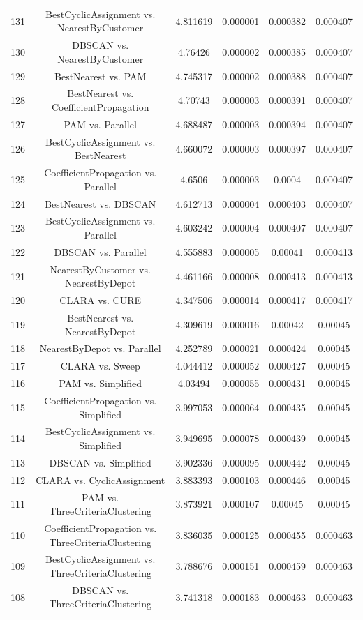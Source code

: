 \documentclass[a4paper,10pt]{article}
\begin{document}
\begin{landscape}
\begin{table}[!htp]
\begin{tabular}{cccccc}
131&BestCyclicAssignment vs. NearestByCustomer&4.811619&0.000001&0.000382&0.000407\\
130&DBSCAN vs. NearestByCustomer&4.76426&0.000002&0.000385&0.000407\\
129&BestNearest vs. PAM&4.745317&0.000002&0.000388&0.000407\\
128&BestNearest vs. CoefficientPropagation&4.70743&0.000003&0.000391&0.000407\\
127&PAM vs. Parallel&4.688487&0.000003&0.000394&0.000407\\
126&BestCyclicAssignment vs. BestNearest&4.660072&0.000003&0.000397&0.000407\\
125&CoefficientPropagation vs. Parallel&4.6506&0.000003&0.0004&0.000407\\
124&BestNearest vs. DBSCAN&4.612713&0.000004&0.000403&0.000407\\
123&BestCyclicAssignment vs. Parallel&4.603242&0.000004&0.000407&0.000407\\
122&DBSCAN vs. Parallel&4.555883&0.000005&0.00041&0.000413\\
121&NearestByCustomer vs. NearestByDepot&4.461166&0.000008&0.000413&0.000413\\
120&CLARA vs. CURE&4.347506&0.000014&0.000417&0.000417\\
119&BestNearest vs. NearestByDepot&4.309619&0.000016&0.00042&0.00045\\
118&NearestByDepot vs. Parallel&4.252789&0.000021&0.000424&0.00045\\
117&CLARA vs. Sweep&4.044412&0.000052&0.000427&0.00045\\
116&PAM vs. Simplified&4.03494&0.000055&0.000431&0.00045\\
115&CoefficientPropagation vs. Simplified&3.997053&0.000064&0.000435&0.00045\\
114&BestCyclicAssignment vs. Simplified&3.949695&0.000078&0.000439&0.00045\\
113&DBSCAN vs. Simplified&3.902336&0.000095&0.000442&0.00045\\
112&CLARA vs. CyclicAssignment&3.883393&0.000103&0.000446&0.00045\\
111&PAM vs. ThreeCriteriaClustering&3.873921&0.000107&0.00045&0.00045\\
110&CoefficientPropagation vs. ThreeCriteriaClustering&3.836035&0.000125&0.000455&0.000463\\
109&BestCyclicAssignment vs. ThreeCriteriaClustering&3.788676&0.000151&0.000459&0.000463\\
108&DBSCAN vs. ThreeCriteriaClustering&3.741318&0.000183&0.000463&0.000463\\

\end{tabular}
\end{table}
\end{landscape}
\end{document}
